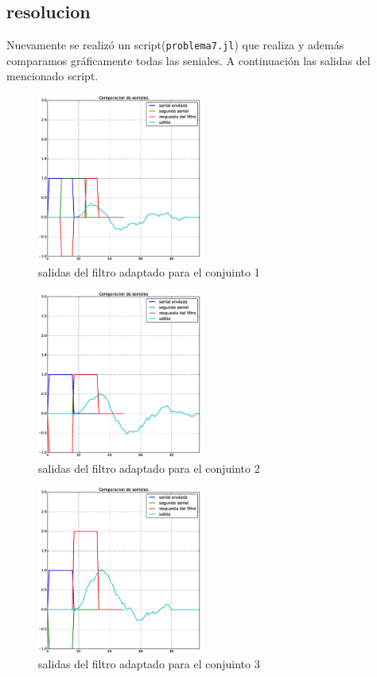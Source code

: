 \documentclass[10pt]{article}
\begin{document}
\subsection{resolucion}
Nuevamente se realizó un script(\verb|problema7.jl|) que realiza 
y además comparamos gráficamente todas las seniales. A continuación las salidas del mencionado script.

\begin{figure}[H] 
\centering
   \includegraphics[width=0.48\textwidth]{./Images/filtro_adaptado1.eps}
   \caption{salidas del filtro adaptado para el conjuinto 1}\label{fig:filtro_1}     
\end{figure}

\begin{figure}[H]
   \centering
   \includegraphics[width=0.48\textwidth]{./Images/filtro_adaptado2.eps}
   \caption{salidas del filtro adaptado para el conjuinto 2}\label{fig:filtro_2}     
\end{figure}

\begin{figure}[H]
   \centering
   \includegraphics[width=0.48\textwidth]{./Images/filtro_adaptado3.eps}
   \caption{salidas del filtro adaptado para el conjuinto 3}\label{fig:filtro_3}     
\end{figure}
\end{document}
